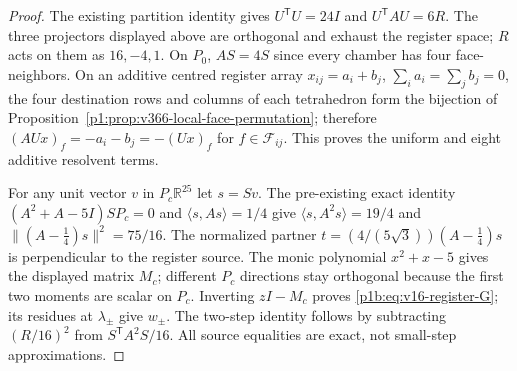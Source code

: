 \documentclass[11pt]{article}
\begin{document}
\begin{proof}
The existing partition identity gives $U^\mathsf TU=24I$
and $U^\mathsf TAU=6R$.  The three projectors displayed above
are orthogonal and exhaust the register space; $R$ acts on them
as $16,-4,1$.  On $P_0$, $AS=4S$ since every chamber has four
face-neighbors.  On an additive centred register array
$x_{ij}=a_i+b_j$, $\sum_i a_i=\sum_j b_j=0$, the four
destination rows and columns of each tetrahedron form the
bijection of Proposition~\ref{p1:prop:v366-local-face-permutation};
therefore $(AUx)_f=-a_i-b_j=-(Ux)_f$ for $f\in\mathscr F_{ij}$.
This proves the uniform and eight additive resolvent terms.

For any unit vector $v$ in $P_c\mathbb R^{25}$ let $s=Sv$.
The pre-existing exact identity
$(A^2+A-5I)SP_c=0$ and $\langle s,As\rangle=1/4$
give $\langle s,A^2s\rangle=19/4$ and
$\|(A-\tfrac14)s\|^2=75/16$.  The normalized partner
$t=(4/(5\sqrt3))(A-\tfrac14)s$ is perpendicular to the
register source.  The monic polynomial $x^2+x-5$ gives the displayed
matrix $M_c$; different $P_c$ directions stay orthogonal because
the first two moments are scalar on $P_c$.  Inverting $zI-M_c$
proves \eqref{p1b:eq:v16-register-G}; its residues at
$\lambda_\pm$ give $w_\pm$.  The two-step identity follows
by subtracting $(R/16)^2$ from $S^\mathsf TA^2S/16$.
All source equalities are exact, not small-step approximations.
\end{proof}
\end{document}
